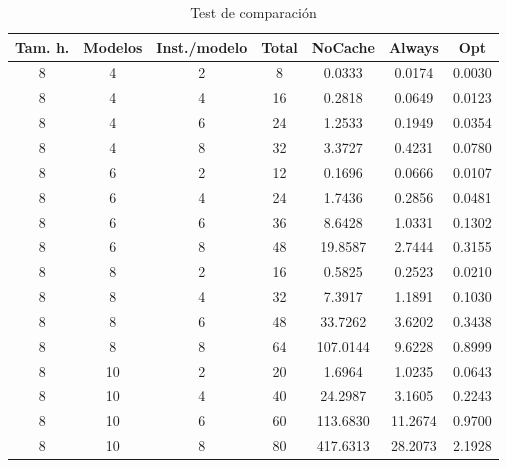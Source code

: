 \begin{table}[H]
\begin{center}
	\begin{tabular}{ | c | c | c | c | c | c | c | }
\hline
Tam. h. & Modelos & Inst./modelo & Total & NoCache & Always & Opt \\ \hline 
8 & 4 & 2 & 8 & 0.0333 & 0.0174 & 0.0030 \\ 
8 & 4 & 4 & 16 & 0.2818 & 0.0649 & 0.0123 \\ 
8 & 4 & 6 & 24 & 1.2533 & 0.1949 & 0.0354 \\ 
8 & 4 & 8 & 32 & 3.3727 & 0.4231 & 0.0780 \\ 
8 & 6 & 2 & 12 & 0.1696 & 0.0666 & 0.0107 \\ 
8 & 6 & 4 & 24 & 1.7436 & 0.2856 & 0.0481 \\ 
8 & 6 & 6 & 36 & 8.6428 & 1.0331 & 0.1302 \\ 
8 & 6 & 8 & 48 & 19.8587 & 2.7444 & 0.3155 \\ 
8 & 8 & 2 & 16 & 0.5825 & 0.2523 & 0.0210 \\ 
8 & 8 & 4 & 32 & 7.3917 & 1.1891 & 0.1030 \\ 
8 & 8 & 6 & 48 & 33.7262 & 3.6202 & 0.3438 \\ 
8 & 8 & 8 & 64 & 107.0144 & 9.6228 & 0.8999 \\ 
8 & 10 & 2 & 20 & 1.6964 & 1.0235 & 0.0643 \\
8 & 10 & 4 & 40 & 24.2987 & 3.1605 & 0.2243 \\
8 & 10 & 6 & 60 & 113.6830 & 11.2674 & 0.9700 \\
8 & 10 & 8 & 80 & 417.6313 & 28.2073 & 2.1928 \\
\hline
	\end{tabular}
\end{center}
\caption{Test de comparación}
\label{table:comp}
\end{table}


